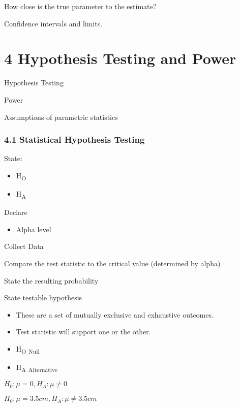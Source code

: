 \documentclass[]{article}
\providecommand{\tightlist}{%
  \setlength{\itemsep}{0pt}\setlength{\parskip}{0pt}}
\begin{document}
How close is the true parameter to the estimate?

Confidence intervals and limits.

\hypertarget{hypothesis-testing-and-power}{%
\section{4 Hypothesis Testing and
Power}\label{hypothesis-testing-and-power}}

Hypothesis Testing

Power

Assumptions of parametric statistics

\hypertarget{statistical-hypothesis-testing}{%
\subsubsection{4.1 Statistical Hypothesis
Testing}\label{statistical-hypothesis-testing}}

State:

\begin{itemize}
\tightlist
\item
  H\textsubscript{O}
\item
  H\textsubscript{A}
\end{itemize}

Declare

\begin{itemize}
\tightlist
\item
  Alpha level
\end{itemize}

Collect Data

Compare the test statistic to the critical value (determined by alpha)

State the resulting probability

State testable hypothesis

\begin{itemize}
\tightlist
\item
  These are a set of mutually exclusive and exhaustive outcomes.
\item
  Test statistic will support one or the other.
\item
  H\textsubscript{O} \textsubscript{Null}\\
\item
  H\textsubscript{A} \textsubscript{Alternative}
\end{itemize}

\(H_0: \mu = 0, H_A:\mu \ne 0\)

\(H_0: \mu = 3.5 cm, H_A:\mu \ne 3.5 cm\)
\end{document}
